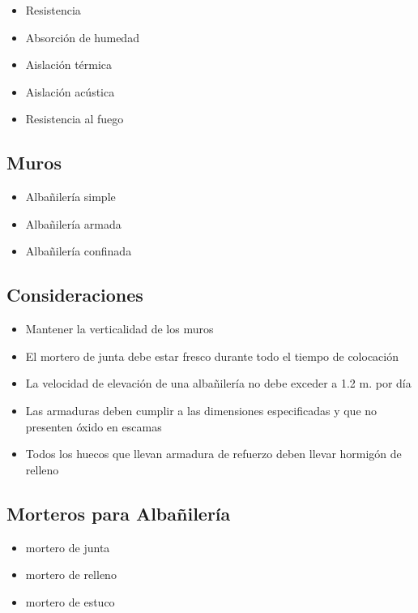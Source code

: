 \begin{itemize}
    \item Resistencia
    \item Absorción de humedad
    \item Aislación térmica
    \item Aislación acústica
    \item Resistencia al fuego
\end{itemize}

\subsection{Muros}
\begin{itemize}
    \item Albañilería simple
    \item Albañilería armada
    \item Albañilería confinada
\end{itemize}

\subsection{Consideraciones}
\begin{itemize}
    \item Mantener la verticalidad de los muros
    \item El mortero de junta debe estar fresco durante todo el tiempo de colocación
    \item La velocidad de elevación de una albañilería no debe exceder a 1.2 m. por día
    \item Las armaduras deben cumplir a las dimensiones especificadas y que no presenten óxido en escamas
    \item Todos los huecos que llevan armadura de refuerzo deben llevar hormigón de relleno
\end{itemize}

\subsection{Morteros para Albañilería}
\begin{itemize}
    \item mortero de junta
    \item mortero de relleno
    \item mortero de estuco
\end{itemize}